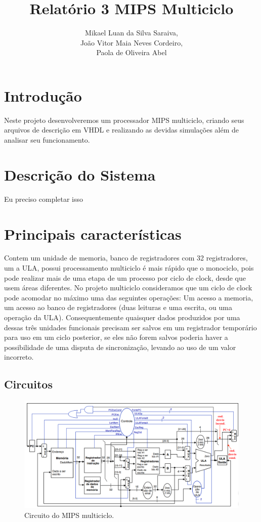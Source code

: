\documentclass{article}
\title{Relatório 3 \- MIPS Multiciclo}
\author{%
    Mikael Luan da Silva Saraiva, \\
    João Vitor Maia Neves Cordeiro, \\
    Paola de Oliveira Abel
    }
\begin{document}
    \maketitle

    \section{Introdução}

    Neste projeto desenvolveremos um processador MIPS multiciclo, criando seus
    arquivos de descrição em VHDL e realizando as devidas simulações além de
    analisar seu funcionamento.

    \section{Descrição do Sistema}

    Eu preciso completar isso

    \section{Principais características}

    Contem um unidade de memoria, banco de registradores com 32 registradores,
    um a ULA, possui processamento multiciclo é mais rápido que o monociclo,
    pois pode realizar mais de uma etapa de um processo por ciclo de clock,
    desde que usem áreas diferentes. No projeto multiciclo consideramos que um
    ciclo de clock pode acomodar no máximo uma das seguintes operações: Um
    acesso a memoria, um acesso ao banco de registradores (duas leituras e uma
    escrita, ou uma operação da ULA). Consequentemente quaisquer dados
    produzidos por uma dessas três unidades funcionais precisam ser salvos em
    um registrador temporário para uso em um ciclo posterior, se eles não forem
    salvos poderia haver a possibilidade de uma disputa de sincronização,
    levando ao uso de um valor incorreto.

        \subsection{Circuitos}


        \begin{figure}[H]
            \centering %
            \includegraphics[width=\textwidth]{circuito_mips.png} %
            \caption{Circuito do MIPS multiciclo.}
            \label{figura:mips}
        \end{figure}
\end{document}
